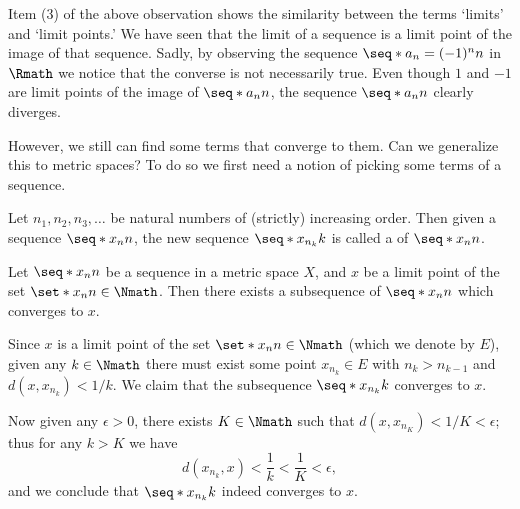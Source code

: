 Item (3) of the above observation shows the similarity
between the terms `limits' and `limit points.'
We have seen that
the limit of a sequence is a limit point of the image of that sequence.
Sadly, by observing the sequence \(\seq*{a_n=(-1)^n}{n}\) in \(\Rmath\)
we notice that the converse is not necessarily true.
Even though \(1\) and \(-1\) are limit points
of the image of \(\seq*{a_n}{n}\),
the sequence \(\seq*{a_n}{n}\) clearly diverges.

However, we still can find some terms that converge to them.
Can we generalize this to metric spaces?
To do so we first need a notion of picking some terms of a sequence.

\begin{definition}
    \label{def:subseq}
    Let \(n_1,n_2,n_3,\dots\) be natural numbers
    of (strictly) increasing order.
    Then given a sequence \(\seq*{x_n}{n}\),
    the new sequence \(\seq*{x_{n_k}}{k}\) is called
    a  of \(\seq*{x_n}{n}\).
\end{definition}

\begin{proposition}
    \label{prop:limptsubseq}
    Let \(\seq*{x_n}{n}\) be a sequence in a metric space \(X\),
    and \(x\) be a limit point of the set \(\set*{x_n}{n\in\Nmath}\).
    Then there exists a subsequence of \(\seq*{x_n}{n}\)
    which converges to \(x\).
\end{proposition}
\begin{myproof}
    Since \(x\) is a limit point of the set \(\set*{x_n}{n\in\Nmath}\)
    (which we denote by \(E\)),
    given any \(k\in\Nmath\)
    there must exist some point \(x_{n_k}\in E\) with
    \(n_k>n_{k-1}\) and \(d(x,x_{n_k})<1/k\).
    We claim that the subsequence \(\seq*{x_{n_k}}{k}\)
    converges to \(x\).
    
    Now given any \(\epsilon>0\),
    there exists \(K\in\Nmath\) such that \(d(x,x_{n_K})<1/K<\epsilon\);
    thus for any \(k>K\) we have
    \[
        d(x_{n_k},x)
        <\frac{1}{k}
        <\frac{1}{K}
        <\epsilon,
    \]
    and we conclude that
    \(\seq*{x_{n_k}}{k}\) indeed converges to \(x\).
\end{myproof}


